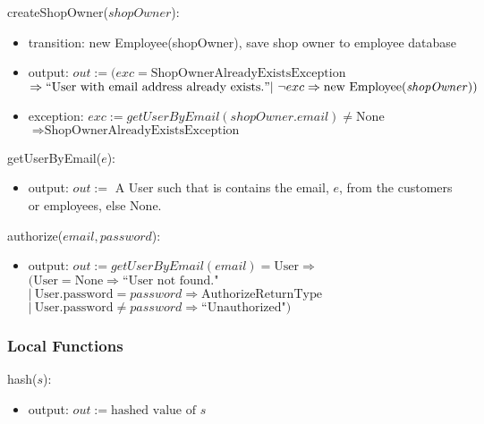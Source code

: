 \documentclass[12pt, titlepage]{article}
\begin{document}
\noindent createShopOwner($shopOwner$):
\begin{itemize}
	\item transition: new Employee(shopOwner), save shop owner to employee database
	\item output: $out := (exc = \text{ShopOwnerAlreadyExistsException}$ \\ $\Rightarrow ``\text{User with
			      email address already exists.}" |\ \neg exc \Rightarrow \text{new Employee(\emph{shopOwner})})$
	\item exception: $exc := getUserByEmail(shopOwner.email) \neq \text{None}$ \\ $\Rightarrow
		      \text{ShopOwnerAlreadyExistsException}$
\end{itemize}

\noindent getUserByEmail($e$):
\begin{itemize}
	\item output: $out :=$ A User such that is contains the email, $e$, from the customers or employees, else
	      None.
\end{itemize}

\noindent authorize($email, password$):
\begin{itemize}
	\item output: $out := getUserByEmail(email) = \text{User} \Rightarrow $ \\ $(\text{User} = \text{None}
		      \Rightarrow \text{``User not found."}$ \\ $|\ \text{User.password} = password \Rightarrow
		      \text{AuthorizeReturnType}$ \\ $|\ \text{User.password} \neq password \Rightarrow
		      \text{``Unauthorized"})$
\end{itemize}

\subsubsection{Local Functions}

\noindent hash($s$):
\begin{itemize}
	\item output: $out := \text{hashed value of } s$
\end{itemize}

\end{document}
